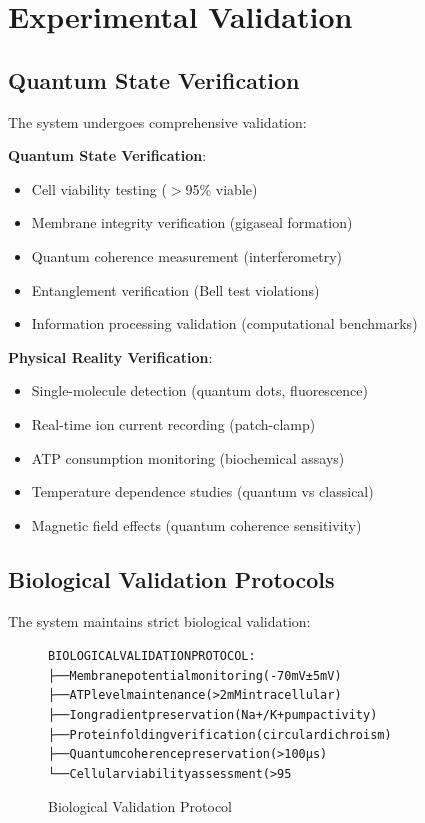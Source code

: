 \documentclass[11pt,a4paper]{article}
\newenvironment{asciiart}{\begin{alltt}}{\end{alltt}}
\begin{document}
\section{Experimental Validation}

\subsection{Quantum State Verification}

The system undergoes comprehensive validation:

\textbf{Quantum State Verification}:
\begin{itemize}
\item Cell viability testing ($>$95\% viable)
\item Membrane integrity verification (gigaseal formation)
\item Quantum coherence measurement (interferometry)
\item Entanglement verification (Bell test violations)
\item Information processing validation (computational benchmarks)
\end{itemize}

\textbf{Physical Reality Verification}:
\begin{itemize}
\item Single-molecule detection (quantum dots, fluorescence)
\item Real-time ion current recording (patch-clamp)
\item ATP consumption monitoring (biochemical assays)
\item Temperature dependence studies (quantum vs classical)
\item Magnetic field effects (quantum coherence sensitivity)
\end{itemize}

\subsection{Biological Validation Protocols}

The system maintains strict biological validation:

\begin{figure}[H]
\centering
\begin{asciiart}
BIOLOGICAL VALIDATION PROTOCOL:
├── Membrane potential monitoring (-70mV ± 5mV)
├── ATP level maintenance (>2mM intracellular)
├── Ion gradient preservation (Na+/K+ pump activity)
├── Protein folding verification (circular dichroism)
├── Quantum coherence preservation (>100μs)
└── Cellular viability assessment (>95%
\end{asciiart}
\caption{Biological Validation Protocol}
\end{figure}
\end{document}

